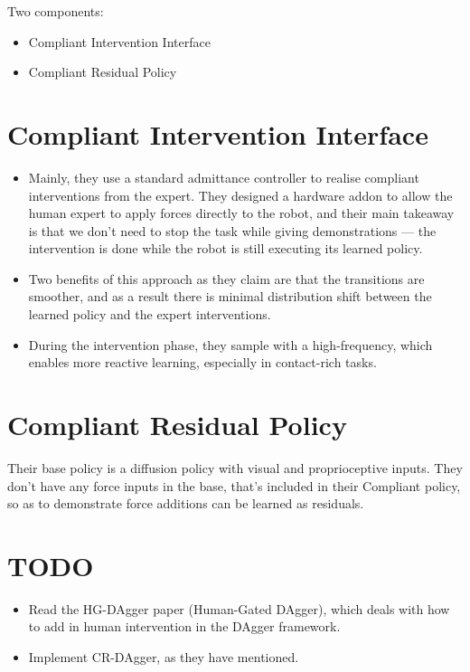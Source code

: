 

Two components:
\begin{itemize}
    \item Compliant Intervention Interface
    \item Compliant Residual Policy
\end{itemize}

\section{Compliant Intervention Interface}

\begin{itemize}
    \item Mainly, they use a standard admittance controller to realise compliant interventions from the expert.
        They designed a hardware addon to allow the human expert to apply forces directly to the robot, and their main takeaway is that we don't need to stop the task while giving demonstrations --- the intervention is done while the robot is still executing its learned policy.

    \item Two benefits of this approach as they claim are that the transitions are smoother, and as a result there is minimal distribution shift between the learned policy and the expert interventions.

    \item During the intervention phase, they sample with a high-frequency, which enables more reactive learning, especially in contact-rich tasks.
\end{itemize}

\section{Compliant Residual Policy}

Their base policy is a diffusion policy with visual and proprioceptive inputs.
They don't have any force inputs in the base, that's included in their Compliant policy, so as to demonstrate force additions can be learned as residuals.

\section{TODO}

\begin{itemize}
    \item Read the HG-DAgger paper (Human-Gated DAgger), which deals with how to add in human intervention in the DAgger framework.

    \item Implement CR-DAgger, as they have mentioned.
\end{itemize}
